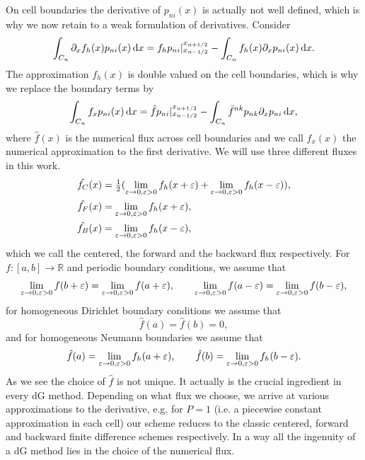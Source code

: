 On cell boundaries the derivative
of $p_{ni}(x)$ is actually not well defined, which is why we now retain to 
a weak formulation of derivatives. 
Consider 
\begin{align}
    \int_{C_n} \partial_x f_h(x) p_{ni}(x) \,\mathrm{d}x = f_h p_{ni}|_{x_{n-1/2}}^{x_{n+1/2}}  -
    \int_{C_n} f_h(x) \partial_x p_{ni}(x) \,\mathrm{d}x.
    \label{}
\end{align}
The approximation $f_h(x)$ is double valued on the cell boundaries, which is why we replace
the boundary terms by
\begin{align}
    \int_{C_n} f_x p_{ni}(x) \,\mathrm{d}x
    = \hat f p_{ni}|_{x_{n-1/2}}^{x_{n+1/2}}  -
    \int_{C_n} \bar f^{nk} p_{nk} \partial_x p_{ni} \,\mathrm{d}x,
    \label{}
\end{align}
where $\hat f(x)$ is the numerical flux across cell boundaries and we call $f_x(x)$ the numerical approximation to the first derivative. We will use three different fluxes in this work. 
\begin{subequations}
\begin{align}
	\hat{f_C}(x) &= \tfrac{1}{2}(\lim_{\varepsilon\to 0,\varepsilon>0}f_h(x+\varepsilon)+\lim_{\varepsilon\to 0,\varepsilon>0}f_h(x-\varepsilon)),\\
	\hat{f_F}(x) &= \lim_{\varepsilon\to 0,\varepsilon>0}f_h(x+\varepsilon), \\
	\hat{f_B}(x) &= \lim_{\varepsilon\to 0,\varepsilon>0}f_h(x-\varepsilon),
\end{align}
\end{subequations}
which we call the centered, the forward and the backward flux respectively.
For $f\colon [a,b]\to\mathbb{R}$ and periodic boundary conditions, we assume that
\begin{equation}
	\lim_{\varepsilon\to 0,\varepsilon>0} f(b+\varepsilon) = \lim_{\varepsilon\to 0,\varepsilon>0} f(a+\varepsilon), \qquad
	\lim_{\varepsilon\to 0,\varepsilon>0} f(a-\varepsilon) = \lim_{\varepsilon\to 0,\varepsilon>0} f(b-\varepsilon),
\end{equation}
for homogeneous Dirichlet boundary conditions we assume that
\begin{equation}
    \hat f(a) = \hat f(b) = 0,
\end{equation}
and for homogeneous Neumann boundaries we assume that
\begin{align}
    \hat f(a) = \lim_{\varepsilon\to 0,\varepsilon>0} f_h(a+\varepsilon), \qquad 
    \hat f(b) = \lim_{\varepsilon\to 0,\varepsilon>0} f_h(b-\varepsilon).
\end{align}
As we see the choice
of $\hat f$ is not unique. It actually is the crucial ingredient in every dG method. 
Depending on what flux we choose, we arrive at various 
approximations to the derivative,
e.g. for $P=1$ (i.e. a piecewise constant approximation in each cell)
our scheme reduces to the classic centered, forward and backward finite difference
schemes respectively.
In a way all the ingenuity of a dG method lies in the choice of the numerical flux.

